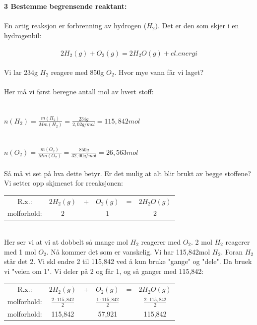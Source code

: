 \documentclass[12pt,a4paper]{article}
\begin{document}
  \noindent\textbf{3 Bestemme begrensende reaktant:}\\\\
    En artig reaksjon er forbrenning av hydrogen ($H_2)$.  Det er den som skjer i en hydrogenbil:\\\\
$$2H_2(g)+O_2(g)=2H_2O(g)+ el. energi$$\\
Vi lar 234g $H_2$ reagere med 850g $O_2$.  Hvor mye vann får vi laget?\\\\
Her må vi først beregne antall mol av hvert stoff:\\\\\\
$n(H_2)=\frac{m(H_2)}{Mm(H_2)}=\frac{234g}{2,02g/mol}=115,842mol$\\\\\\
$n(O_2)=\frac{m(O_2)}{Mm(O_2)}=\frac{850g}{32,00g/mol}=26,563mol$\\\\
Så må vi set på hva dette betyr.  Er det mulig at alt blir brukt av begge stoffene?  Vi setter opp skjmeaet for reeaksjonen:\\
\begin{table}[h!]
    \centering
    \begin{tabular}{cccccc}
         R.x.:&  $2H_2(g)$&  +&  $O_2(g)$&  =& $2H_2O(g)$\\
         molforhold:&$2$  &  & $1$ &  &$2$ \\
                   
    \end{tabular}
\end{table}\\
Her ser vi at vi at dobbelt så mange mol $H_2$ reagerer med $O_2$.  2 mol $H_2$ reagerer med 1 mol $O_2$. Nå kommer det som er vanskelig. Vi har 115,842mol $H_2$.  Foran $H_2$ står det 2. Vi skl endre 2 til 115,842 ved å kun bruke "gange" og "dele".  Da bruek vi "veien om 1".\newpage 
Vi deler på 2 og får 1, og så ganger med 115,842:\\
\begin{table}[h!]
    \centering
    \begin{tabular}{cccccc}
         R.x.:&  $2H_2(g)$&  +&  $O_2(g)$&  =& $2H_2O(g)$\\
         molforhold:&$\frac{2\cdot 115,842}{2}$  &  & $\frac{1\cdot 115,842}{2}$ &  &$\frac{2\cdot 115,842}{2}$ \\
         molforhold:&115,842& &57,921&&115,842
    \end{tabular}
\end{table}\\
\end{document}
